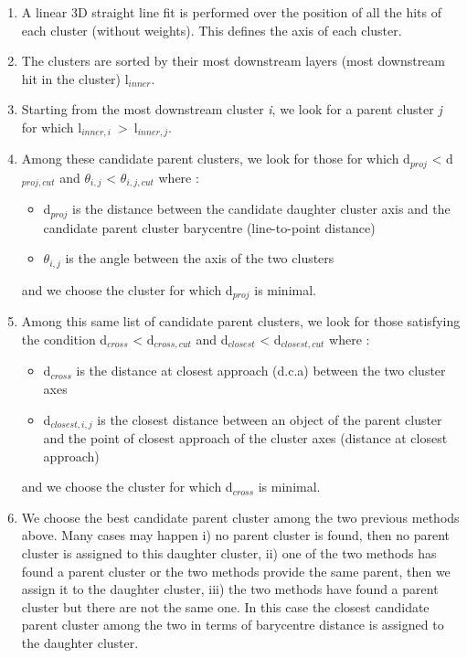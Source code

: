 \documentclass[cits]{JINST}
\begin{document}
\begin{enumerate}
  \item A linear 3D straight line fit is performed over the position of all the hits of each cluster (without weights). This defines the axis of each cluster.
  \item The clusters are sorted by their most downstream layers (most downstream hit in the cluster) l$_{inner}$.
  \item Starting from the most downstream cluster \textit{i}, we look for a parent cluster \textit{j} for which l$_{inner,i}$~>~l$_{inner,j}$.
  \item Among these candidate parent clusters, we look for those for which d$_{proj}$ < d$_{proj,cut}$ and $\theta_{i,j}$ < $\theta_{i,j,cut}$  where :
  \begin{itemize}
    \item d$_{proj}$ is the distance between the candidate daughter cluster axis and the candidate parent cluster barycentre (line-to-point distance)
    \item $\theta_{i,j}$ is the angle between the axis of the two clusters
  \end{itemize}
  and we choose the cluster for which d$_{proj}$ is minimal.  
  \item Among this same list of candidate parent clusters, we look for those satisfying the condition d$_{cross}$ < d$_{cross,cut}$ and d$_{closest}$ < d$_{closest,cut}$ where :
  \begin{itemize}
    \item d$_{cross}$ is the distance at closest approach (d.c.a) between the two cluster axes
    \item d$_{closest,i,j}$ is the closest distance between an object of the parent cluster and the point of closest approach of the cluster axes (distance at closest approach)
  \end{itemize}
  and we choose the cluster for which d$_{cross}$ is minimal.
  \item We choose the best candidate parent cluster among the two previous methods above. Many cases may happen i) no parent cluster is found, then no parent cluster is assigned to this daughter cluster, ii) one of the two methods has found a parent cluster or the two methods provide the same parent, then we assign it to the daughter cluster, iii) the two methods have found a parent cluster but there are not the same one. In this case the closest candidate parent cluster among the two in terms of barycentre distance is assigned to the daughter cluster.

\end{enumerate}
\end{document}
